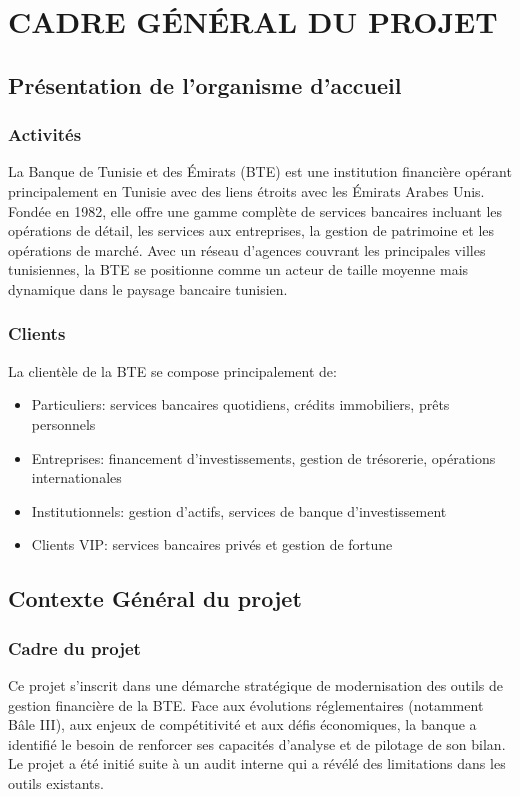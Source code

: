\documentclass[12pt,a4paper]{report}
\begin{document}
\chapter{CADRE GÉNÉRAL DU PROJET}

\section{Présentation de l'organisme d'accueil}
\subsection{Activités}
La Banque de Tunisie et des Émirats (BTE) est une institution financière opérant principalement en Tunisie avec des liens étroits avec les Émirats Arabes Unis. Fondée en 1982, elle offre une gamme complète de services bancaires incluant les opérations de détail, les services aux entreprises, la gestion de patrimoine et les opérations de marché. Avec un réseau d'agences couvrant les principales villes tunisiennes, la BTE se positionne comme un acteur de taille moyenne mais dynamique dans le paysage bancaire tunisien.

\subsection{Clients}
La clientèle de la BTE se compose principalement de:
\begin{itemize}
    \item Particuliers: services bancaires quotidiens, crédits immobiliers, prêts personnels
    \item Entreprises: financement d'investissements, gestion de trésorerie, opérations internationales
    \item Institutionnels: gestion d'actifs, services de banque d'investissement
    \item Clients VIP: services bancaires privés et gestion de fortune
\end{itemize}

\section{Contexte Général du projet}

\subsection{Cadre du projet}
Ce projet s'inscrit dans une démarche stratégique de modernisation des outils de gestion financière de la BTE. Face aux évolutions réglementaires (notamment Bâle III), aux enjeux de compétitivité et aux défis économiques, la banque a identifié le besoin de renforcer ses capacités d'analyse et de pilotage de son bilan. Le projet a été initié suite à un audit interne qui a révélé des limitations dans les outils existants.
\end{document}
